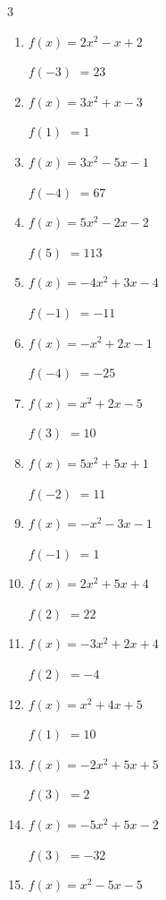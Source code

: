 \begin{multicols}{3}
\begin{enumerate}
$f(3)$
        $= 45$

\columnbreak %

\resetques

  \item $f(x)=2x^{2}-x+2$

$f(-3)$
        $= 23$

  \item $f(x)=3x^{2}+x-3$

$f(1)$
        $= 1$

  \item $f(x)=3x^{2}-5x-1$

$f(-4)$
        $= 67$

  \item $f(x)=5x^{2}-2x-2$

$f(5)$
        $= 113$

  \item $f(x)=-4x^{2}+3x-4$

$f(-1)$
        $= -11$

  \item $f(x)=-x^{2}+2x-1$

$f(-4)$
        $= -25$

  \item $f(x)=x^{2}+2x-5$

$f(3)$
        $= 10$

  \item $f(x)=5x^{2}+5x+1$

$f(-2)$
        $= 11$

  \item $f(x)=-x^{2}-3x-1$

$f(-1)$
        $= 1$

  \item $f(x)=2x^{2}+5x+4$

$f(2)$
        $= 22$

  \item $f(x)=-3x^{2}+2x+4$

$f(2)$
        $= -4$

  \item $f(x)=x^{2}+4x+5$

$f(1)$
        $= 10$

  \item $f(x)=-2x^{2}+5x+5$

$f(3)$
        $= 2$

  \item $f(x)=-5x^{2}+5x-2$

$f(3)$
        $= -32$

  \item $f(x)=x^{2}-5x-5$


\end{enumerate}
\end{multicols}
